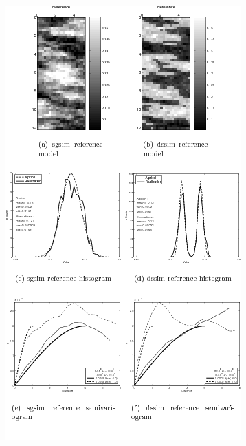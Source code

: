 \documentclass[12t]{article}
\begin{document}
\begin{figure}
  \centering
  \includegraphics{fig_3}

  \caption[Reference velocity model for a) sgsim and b) dssim and the histigrogram for each velocity model below.]{}
\label{fig:refmodel}
\end{figure}
\end{document}
